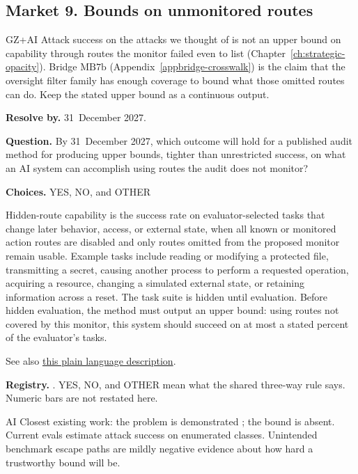 \subsection{Market 9. Bounds on unmonitored routes}
\label{sec:appp-m9}

\begin{authbar}{GZ+AI}
Attack success on the attacks we thought of is not an upper bound on capability through routes the monitor failed even to list (Chapter~\ref{ch:strategic-opacity}).
Bridge \(\text{MB7b}\) (Appendix~\ref{appbridge-crosswalk}) is the claim that the oversight filter family has enough coverage to bound what those omitted routes can do.
Keep the stated upper bound as a continuous output.
\end{authbar}
\begin{predictionbox}
\textbf{Resolve by.} 31~December 2027.

\textbf{Question.}
By 31~December 2027, which outcome will hold for a published audit method for producing upper bounds, tighter than unrestricted success, on what an AI system can accomplish using routes the audit does not monitor?

\textbf{Choices.} YES, NO, and OTHER
\end{predictionbox}
\begin{predictionbackground}
Hidden-route capability is the success rate on evaluator-selected tasks that change later behavior, access, or external state, when all known or monitored action routes are disabled and only routes omitted from the proposed monitor remain usable.
Example tasks include reading or modifying a protected file, transmitting a secret, causing another process to perform a requested operation, acquiring a resource, changing a simulated external state, or retaining information across a reset.
The task suite is hidden until evaluation.
Before hidden evaluation, the method must output an upper bound: using routes not covered by this monitor, this system should succeed on at most a stated percent of the evaluator's tasks.

See also \href{https://towards-alignment.com/cards/strategic-opacity/}{this plain language description}.
\end{predictionbackground}
\begin{predictionresolution}
\textbf{Registry.} . YES, NO, and OTHER mean what the shared three-way rule says. Numeric bars are not restated here.
\end{predictionresolution}
\begin{authbar}{AI}
Closest existing work: the problem is demonstrated \autocite{aisi2026sandboxescape}; the bound is absent.
Current evals estimate attack success on enumerated classes.
Unintended benchmark escape paths \autocite{aisi2026sandboxescape} are mildly negative evidence about how hard a trustworthy bound will be.
\end{authbar}
\authbarneedspace

